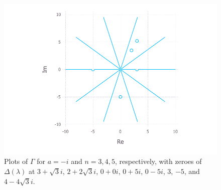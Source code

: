 \documentclass[11pt, oneside, a4paper]{article}
\begin{document}
\begin{figure}[htpb!]
    \endminipage\hfill
      \includegraphics[width=\linewidth]{contourPlot_a=-i_n=5.pdf}
    \endminipage
    \caption{Plots of $\Gamma$ for $a=-i$ and $n=3, 4, 5$, respectively, with zeroes of $\Delta(\lambda)$ at $3+\sqrt{3}i$, $2+2\sqrt{3}i$, $0+0i$, $0+5i$, $0-5i$, $3$, $-5$, and $4-4\sqrt{3}i$.}
    \label{fig:contourPlot_a=-i}
\end{figure}
\end{document}
